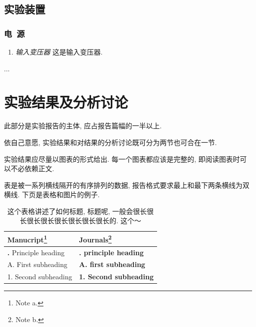 \documentclass[12pt,a4paper]{article}
\begin{document}
\begin{spacing}{2}
\subsection{实验装置}
\subsubsection{电~源}
\begin{enumerate}
\item {\it 输入变压器} 这是输入变压器. %
\end{enumerate}
...

\section{实验结果及分析讨论}
此部分是实验报告的主体, 应占报告篇幅的一半以上.\par
依自己意愿, 实验结果和对结果的分析讨论既可分为两节也可合在一节.\par
实验结果应尽量以图表的形式给出. 每一个图表都应该是完整的, 即阅读图表时可以不必依赖正文.\par
表是被一系列横线隔开的有序排列的数据, 报告格式要求最上和最下两条横线为双横线. 下页是表格和图片的例子.\par

\begin{table}[htbp]
\caption{这个表格讲述了如何标题, 标题呢, 一般会很长很长很长很长很长很长很长很长的. 这个～}
\label{tab:table1}
\begin{minipage}{\textwidth}
\begin{tabularx}{\textwidth}{ll}
 \hline\hline
  Manucript\footnote{Note a.} & Journals\footnote{Note b.} \\
 \midrule
  {\bf\uppercase\expandafter{\romannumeral 1}.} Principle heading & {\bf\uppercase\expandafter{\romannumeral 1}. principle heading} \\
  A. First subheading & {\bf A. first subheading} \\
  1. Second subheading & {\bf 1. Second subheading} \\
 \hline\hline
\end{tabularx}
\end{minipage}
\end{table}


\end{spacing}
\end{document}

